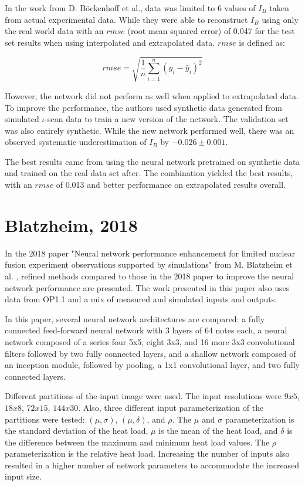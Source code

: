 In the work from D. Böckenhoff et al., data was limited to 6 values of $I_B$ taken from actual experimental data. While they were able to reconstruct $I_B$ using only the real world data with an $rmse$ (root mean squared error) of 0.047 for the test set results when using interpolated and extrapolated data. $rmse$ is defined as:

\begin{equation}
	rmse = \sqrt{\frac{1}{n}\sum_{i=1}^{n}(y_i - \hat{y}_i)^2}
\end{equation}

However, the network did not perform as well when applied to extrapolated data. To improve the performance, the authors used synthetic data generated from simulated $\iota$-scan data to train a new version of the network. The validation set was also entirely synthetic. While the new network performed well, there was an observed systematic underestimation of $I_B$ by $-0.026 \pm 0.001$.

The best results came from using the neural network pretrained on synthetic data and trained on the real data set after. The combination yielded the best results, with an $rmse$ of 0.013 and better performance on extrapolated results overall.

\section{Blatzheim, 2018}
In the 2018 paper "Neural network performance enhancement for limited nuclear fusion experiment observations supported by simulations" from M. Blatzheim et al. \cite{Blatzheim_2018}, refined methods compared to those in the 2018 paper to improve the neural network performance are presented. The work presented in this paper also uses data from OP1.1 and a mix of measured and simulated inputs and outputs.

In this paper, several neural network architectures are compared: a fully connected feed-forward neural network with 3 layers of 64 notes each, a neural network composed of a series four 5x5, eight 3x3, and 16 more 3x3 convolutional filters followed by two fully connected layers, and a shallow network composed of an inception module, followed by pooling, a 1x1 convolutional layer, and two fully connected layers.

Different partitions of the input image were used. The input resolutions were $9x5$, $18x8$, $72x15$, $144x30$. Also, three different input parameterization of the partitions were tested: $(\mu, \sigma)$, $(\mu, \delta)$, and $\rho$. The $\mu$ and $\sigma$ parameterization is the standard deviation of the heat load, $\mu$ is the mean of the heat load, and $\delta$ is the difference between the maximum and minimum heat load values. The $\rho$ parameterization is the relative heat load. Increasing the number of inputs also resulted in a higher number of network parameters to accommodate the increased input size.

